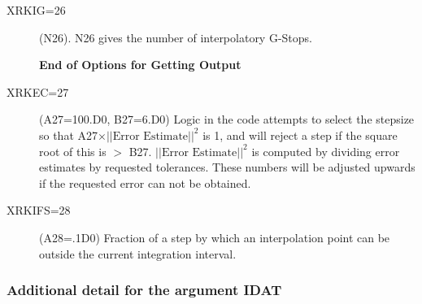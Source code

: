 \documentclass[twoside]{MATH77}
\begin{document}
\begin{description}
\item[XRKIG=26] (N26).  N26 gives the number of interpolatory G-Stops.
\item[ ] {\bf \hspace{-10pt} End of Options for Getting Output}
\item[XRKEC=27] (A27=100.D0, B27=6.D0) Logic in the code attempts to
  select the stepsize so that A27$ \times ||\text{Error Estimate}||^2$
  is 1, and will reject a step if the square root of this is $>$ B27.
  $||\text{Error Estimate}||^2$ is computed by dividing error
  estimates by requested tolerances.  These numbers will be adjusted
  upwards if the requested error can not be obtained.
\item[XRKIFS=28] (A28=.1D0) Fraction of a step by which an interpolation
   point can be outside the current integration interval.
\end{description}

\subsubsection{Additional detail for the argument IDAT\label{IDAT}}
\end{document}
